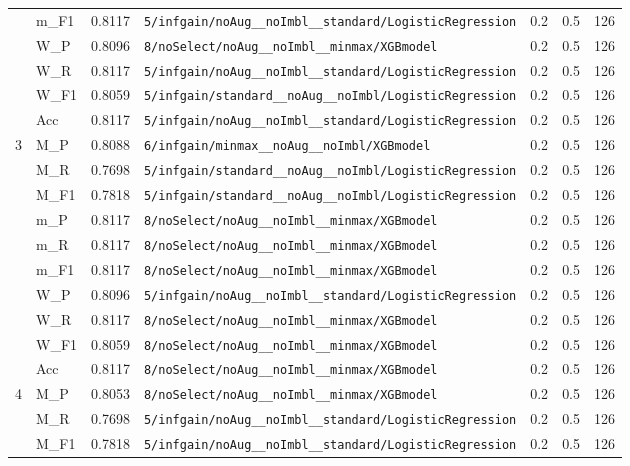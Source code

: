 \begin{table}[htbp]
\begin{tabular}{|c|l|c|>{\ttfamily\footnotesize}p{7.2cm}|c|c|c|}
 & m\_F1 & 0.8117 & \texttt{5/infgain/noAug\_\_noImbl\_\_standard/LogisticRegression} & 0.2 & 0.5  & 126 \\ 
 & W\_P & 0.8096 & \texttt{8/noSelect/noAug\_\_noImbl\_\_minmax/XGBmodel} & 0.2 & 0.5  & 126 \\ 
 & W\_R & 0.8117 & \texttt{5/infgain/noAug\_\_noImbl\_\_standard/LogisticRegression} & 0.2 & 0.5  & 126 \\ 
 & W\_F1 & 0.8059 & \texttt{5/infgain/standard\_\_noAug\_\_noImbl/LogisticRegression} & 0.2 & 0.5  & 126 \\ 
 & Acc & 0.8117 & \texttt{5/infgain/noAug\_\_noImbl\_\_standard/LogisticRegression} & 0.2 & 0.5  & 126 \\ 
\hline
\multirow{10}{*}{3} & M\_P & 0.8088 & \texttt{6/infgain/minmax\_\_noAug\_\_noImbl/XGBmodel} & 0.2 & 0.5  & 126 \\ 
 & M\_R & 0.7698 & \texttt{5/infgain/standard\_\_noAug\_\_noImbl/LogisticRegression} & 0.2 & 0.5  & 126 \\ 
 & M\_F1 & 0.7818 & \texttt{5/infgain/standard\_\_noAug\_\_noImbl/LogisticRegression} & 0.2 & 0.5  & 126 \\ 
 & m\_P & 0.8117 & \texttt{8/noSelect/noAug\_\_noImbl\_\_minmax/XGBmodel} & 0.2 & 0.5  & 126 \\ 
 & m\_R & 0.8117 & \texttt{8/noSelect/noAug\_\_noImbl\_\_minmax/XGBmodel} & 0.2 & 0.5  & 126 \\ 
 & m\_F1 & 0.8117 & \texttt{8/noSelect/noAug\_\_noImbl\_\_minmax/XGBmodel} & 0.2 & 0.5  & 126 \\ 
 & W\_P & 0.8096 & \texttt{5/infgain/noAug\_\_noImbl\_\_standard/LogisticRegression} & 0.2 & 0.5  & 126 \\ 
 & W\_R & 0.8117 & \texttt{8/noSelect/noAug\_\_noImbl\_\_minmax/XGBmodel} & 0.2 & 0.5  & 126 \\ 
 & W\_F1 & 0.8059 & \texttt{8/noSelect/noAug\_\_noImbl\_\_minmax/XGBmodel} & 0.2 & 0.5  & 126 \\ 
 & Acc & 0.8117 & \texttt{8/noSelect/noAug\_\_noImbl\_\_minmax/XGBmodel} & 0.2 & 0.5  & 126 \\ 
\hline
\multirow{10}{*}{4} & M\_P & 0.8053 & \texttt{8/noSelect/noAug\_\_noImbl\_\_minmax/XGBmodel} & 0.2 & 0.5  & 126 \\ 
 & M\_R & 0.7698 & \texttt{5/infgain/noAug\_\_noImbl\_\_standard/LogisticRegression} & 0.2 & 0.5  & 126 \\ 
 & M\_F1 & 0.7818 & \texttt{5/infgain/noAug\_\_noImbl\_\_standard/LogisticRegression} & 0.2 & 0.5  & 126 \\ 

\end{tabular}
\end{table}
